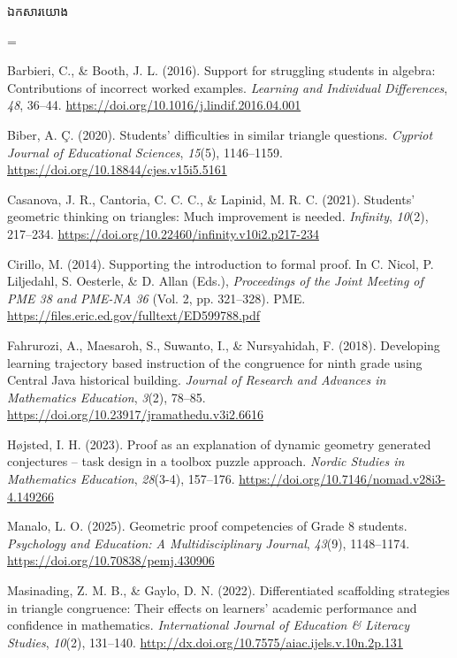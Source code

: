 \documentclass[a4paper,12pt]{article}
\newcommand{\refbanner}[1]{%
  \needspace{2.2cm}%
  \vspace{4pt}%
  \begin{tcolorbox}[
    enhanced, sharp corners, colback=stepgray, colframe=black,
    boxrule=1.1pt, borderline south={0.6pt}{1.8pt}{black},
    top=6pt, bottom=6pt, left=9pt, right=9pt,
    before skip=10pt, after skip=8pt
  ]
    {\muol\fontsize{12pt}{19pt}\selectfont #1}%
  \end{tcolorbox}%
}
\begin{document}
\refbanner{ឯកសារយោង}

{\TimesEn\fontsize{10.8pt}{16.2pt}\selectfont
\setlength{\parskip}{4.5pt}
\everypar={\hangindent=0.85cm }

Barbieri, C., \& Booth, J. L. (2016). Support for struggling students in algebra: Contributions of incorrect worked examples. \textit{Learning and Individual Differences}, \textit{48}, 36--44. \url{https://doi.org/10.1016/j.lindif.2016.04.001}

Biber, A. \c{C}. (2020). Students' difficulties in similar triangle questions. \textit{Cypriot Journal of Educational Sciences}, \textit{15}(5), 1146--1159. \url{https://doi.org/10.18844/cjes.v15i5.5161}

Casanova, J. R., Cantoria, C. C. C., \& Lapinid, M. R. C. (2021). Students' geometric thinking on triangles: Much improvement is needed. \textit{Infinity}, \textit{10}(2), 217--234. \url{https://doi.org/10.22460/infinity.v10i2.p217-234}

Cirillo, M. (2014). Supporting the introduction to formal proof. In C. Nicol, P. Liljedahl, S. Oesterle, \& D. Allan (Eds.), \textit{Proceedings of the Joint Meeting of PME 38 and PME-NA 36} (Vol. 2, pp. 321--328). PME. \url{https://files.eric.ed.gov/fulltext/ED599788.pdf}

Fahrurozi, A., Maesaroh, S., Suwanto, I., \& Nursyahidah, F. (2018). Developing learning trajectory based instruction of the congruence for ninth grade using Central Java historical building. \textit{Journal of Research and Advances in Mathematics Education}, \textit{3}(2), 78--85. \url{https://doi.org/10.23917/jramathedu.v3i2.6616}

H\o jsted, I. H. (2023). Proof as an explanation of dynamic geometry generated conjectures -- task design in a toolbox puzzle approach. \textit{Nordic Studies in Mathematics Education}, \textit{28}(3-4), 157--176. \url{https://doi.org/10.7146/nomad.v28i3-4.149266}

Manalo, L. O. (2025). Geometric proof competencies of Grade 8 students. \textit{Psychology and Education: A Multidisciplinary Journal}, \textit{43}(9), 1148--1174. \url{https://doi.org/10.70838/pemj.430906}

Masinading, Z. M. B., \& Gaylo, D. N. (2022). Differentiated scaffolding strategies in triangle congruence: Their effects on learners' academic performance and confidence in mathematics. \textit{International Journal of Education \& Literacy Studies}, \textit{10}(2), 131--140. \url{http://dx.doi.org/10.7575/aiac.ijels.v.10n.2p.131}

}
\end{document}
